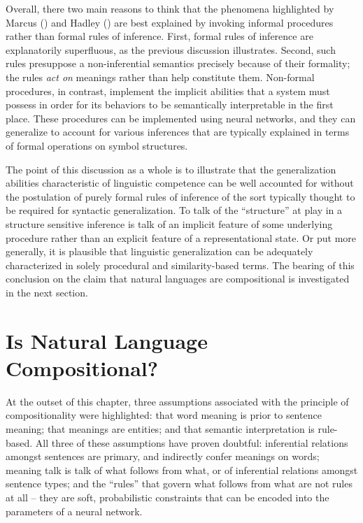 Overall, there two main reasons to think that the phenomena highlighted by Marcus (\citeyear{Marcus:1998}) and Hadley (\citeyear{Hadley:2009}) are best explained by invoking informal procedures rather than formal rules of inference. First, formal rules of inference are explanatorily superfluous, as the previous discussion illustrates. Second, such rules presuppose a non-inferential semantics precisely because of their formality; the rules \textit{act on} meanings rather than help constitute them. Non-formal procedures, in contrast, implement the implicit abilities that a system must possess in order for its behaviors to be semantically interpretable in the first place. These procedures can be implemented using neural networks, and they can generalize to account for various inferences that are typically explained in terms of formal operations on symbol structures.

The point of this discussion as a whole is to illustrate that the generalization abilities characteristic of linguistic competence can be well accounted for without the postulation of purely formal rules of inference of the sort typically thought to be required for syntactic generalization. To talk of the ``structure'' at play in a structure sensitive inference is talk of an implicit feature of some underlying procedure rather than an explicit feature of a representational state. Or put more generally, it is plausible that linguistic generalization can be adequately characterized in solely procedural and similarity-based terms. The bearing of this conclusion on the claim that natural languages are compositional is investigated in the next section.  

\section{Is Natural Language Compositional?}

At the outset of this chapter, three assumptions associated with the principle of compositionality were highlighted: that word meaning is prior to sentence meaning; that meanings are entities; and that semantic interpretation is rule-based. All three of these assumptions have proven doubtful: inferential relations amongst sentences are primary, and indirectly confer meanings on words; meaning talk is talk of what follows from what, or of inferential relations amongst sentence types; and the ``rules'' that govern what follows from what are not rules at all -- they are soft, probabilistic constraints that can be encoded into the parameters of a neural network. 

